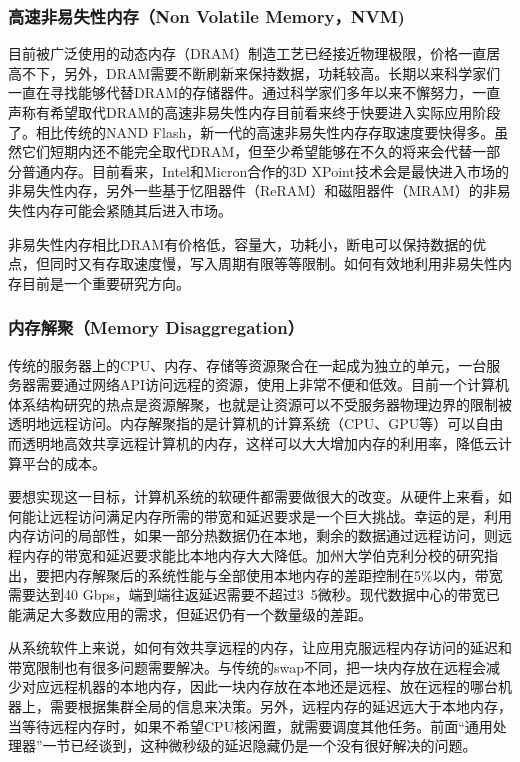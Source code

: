 \subsubsection{高速非易失性内存（Non Volatile Memory，NVM)}

目前被广泛使用的动态内存（DRAM）制造工艺已经接近物理极限，价格一直居高不下，另外，DRAM需要不断刷新来保持数据，功耗较高。长期以来科学家们一直在寻找能够代替DRAM的存储器件。通过科学家们多年以来不懈努力，一直声称有希望取代DRAM的高速非易失性内存目前看来终于快要进入实际应用阶段了。相比传统的NAND Flash，新一代的高速非易失性内存存取速度要快得多。虽然它们短期内还不能完全取代DRAM，但至少希望能够在不久的将来会代替一部分普通内存。目前看来，Intel和Micron合作的3D XPoint技术会是最快进入市场的非易失性内存，另外一些基于忆阻器件（ReRAM）和磁阻器件（MRAM）的非易失性内存可能会紧随其后进入市场。

非易失性内存相比DRAM有价格低，容量大，功耗小，断电可以保持数据的优点，但同时又有存取速度慢，写入周期有限等等限制。如何有效地利用非易失性内存目前是一个重要研究方向。

\subsubsection{内存解聚（Memory Disaggregation）}

传统的服务器上的CPU、内存、存储等资源聚合在一起成为独立的单元，一台服务器需要通过网络API访问远程的资源，使用上非常不便和低效。目前一个计算机体系结构研究的热点是资源解聚，也就是让资源可以不受服务器物理边界的限制被透明地远程访问。内存解聚指的是计算机的计算系统（CPU、GPU等）可以自由而透明地高效共享远程计算机的内存，这样可以大大增加内存的利用率，降低云计算平台的成本。

要想实现这一目标，计算机系统的软硬件都需要做很大的改变。从硬件上来看，如何能让远程访问满足内存所需的带宽和延迟要求是一个巨大挑战。幸运的是，利用内存访问的局部性，如果一部分热数据仍在本地，剩余的数据通过远程访问，则远程内存的带宽和延迟要求能比本地内存大大降低。加州大学伯克利分校的研究指出，要把内存解聚后的系统性能与全部使用本地内存的差距控制在5\%以内，带宽需要达到40 Gbps，端到端往返延迟需要不超过3~5微秒。现代数据中心的带宽已能满足大多数应用的需求，但延迟仍有一个数量级的差距。

从系统软件上来说，如何有效共享远程的内存，让应用克服远程内存访问的延迟和带宽限制也有很多问题需要解决。与传统的swap不同，把一块内存放在远程会减少对应远程机器的本地内存，因此一块内存放在本地还是远程、放在远程的哪台机器上，需要根据集群全局的信息来决策。另外，远程内存的延迟远大于本地内存，当等待远程内存时，如果不希望CPU核闲置，就需要调度其他任务。前面“通用处理器”一节已经谈到，这种微秒级的延迟隐藏仍是一个没有很好解决的问题。

